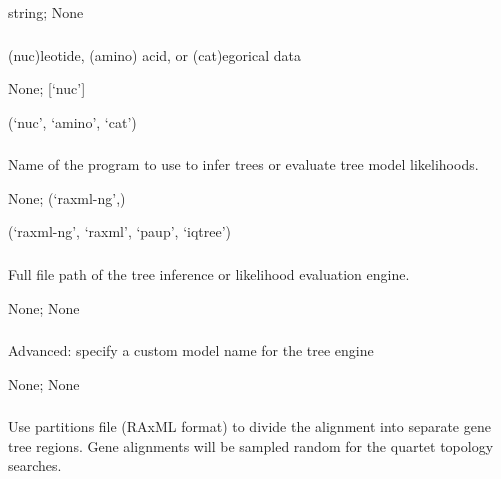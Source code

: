 \documentclass[letterpaper,12pt,english]{sphinxmanual}
\begin{document}
 string;  None


\subsubsection{}
\label{\detokenize{prog_desc:data-type}}
 (nuc)leotide, (amino) acid, or (cat)egorical data

 None;  {[}‘nuc’{]}

 (‘nuc’, ‘amino’, ‘cat’)


\subsubsection{}
\label{\detokenize{prog_desc:engine}}
 Name of the program to use to infer trees or evaluate tree model likelihoods.

 None;  (‘raxml-ng’,)

 (‘raxml-ng’, ‘raxml’, ‘paup’, ‘iqtree’)


\subsubsection{}
\label{\detokenize{prog_desc:engine-exec}}
 Full file path of the tree inference or likelihood evaluation engine.

 None;  None


\subsubsection{}
\label{\detokenize{prog_desc:engine-model}}
 Advanced: specify a custom model name for the tree engine

 None;  None


\subsubsection{}
\label{\detokenize{prog_desc:genetrees}}
 Use partitions file (RAxML format) to divide the alignment into separate gene tree regions. Gene alignments will be sampled random for the quartet topology searches.
\end{document}
